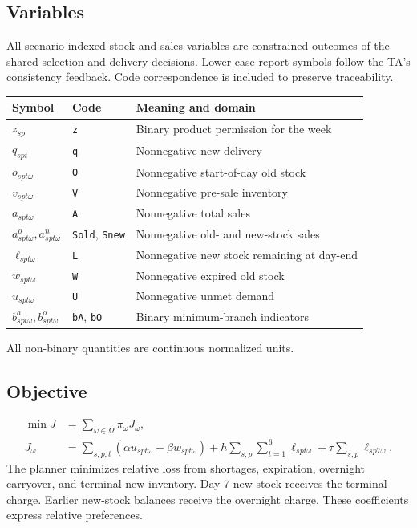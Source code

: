 \documentclass[11pt,letterpaper]{article}
\begin{document}
\subsection{Variables}
All scenario-indexed stock and sales variables are constrained outcomes
of the shared selection and delivery decisions. Lower-case report
symbols follow the TA's consistency feedback. Code correspondence is
included to preserve traceability.
\begin{table}[H]\centering
\begin{tabularx}{\linewidth}{llX}\toprule
Symbol & Code & Meaning and domain\\\midrule
$z_{sp}$ & \texttt{z} & Binary product permission for the week\\
$q_{spt}$ & \texttt{q} & Nonnegative new delivery\\
$o_{spt\omega}$ & \texttt{O} & Nonnegative start-of-day old stock\\
$v_{spt\omega}$ & \texttt{V} & Nonnegative pre-sale inventory\\
$a_{spt\omega}$ & \texttt{A} & Nonnegative total sales\\
$a^o_{spt\omega},a^n_{spt\omega}$ & \texttt{Sold}, \texttt{Snew} & Nonnegative old- and new-stock sales\\
$\ell_{spt\omega}$ & \texttt{L} & Nonnegative new stock remaining at day-end\\
$w_{spt\omega}$ & \texttt{W} & Nonnegative expired old stock\\
$u_{spt\omega}$ & \texttt{U} & Nonnegative unmet demand\\
$b^a_{spt\omega},b^o_{spt\omega}$ & \texttt{bA}, \texttt{bO} & Binary minimum-branch indicators\\\bottomrule
\end{tabularx}\end{table}
All non-binary quantities are continuous normalized units.

\subsection{Objective}
\begin{equation}
\begin{aligned}
\min J&=\sum_{\omega\in\Omega}\pi_\omega J_\omega,\\
J_\omega&=\sum_{s,p,t}(\alpha u_{spt\omega}+\beta w_{spt\omega})
+h\sum_{s,p}\sum_{t=1}^{6}\ell_{spt\omega}
+\tau\sum_{s,p}\ell_{sp7\omega}.
\end{aligned}
\end{equation}
The planner minimizes relative loss from shortages, expiration,
overnight carryover, and terminal new inventory. Day-7 new stock receives
the terminal charge. Earlier new-stock balances receive the overnight
charge. These coefficients express relative preferences.
\end{document}
